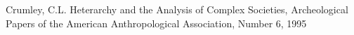 \documentclass[
12pt,		%
openright,	%
twoside,  %
a4paper,			%
chapter=TITLE,		%
english,			%
french,				%
spanish,			%
brazil				%
]{USPSC-classe/USPSC}
\begin{document}
\begin{flushleft}
\begin{flushleft}
\begin{flushleft}
\begin{flushleft}
\begin{flushleft}
\begin{flushleft}
\begin{flushleft}
\begin{flushleft}
\begin{flushleft}
\begin{flushleft}
[CRUMLEY, 1995] Crumley, C.L. Heterarchy and the Analysis of Complex Societies, Archeological Papers of the American Anthropological Association, Number 6, 1995
\end{flushleft}


\end{flushleft}


\end{flushleft}


\end{flushleft}


\end{flushleft}


\end{flushleft}


\end{flushleft}


\end{flushleft}


\end{flushleft}


\end{flushleft}
\end{document}
